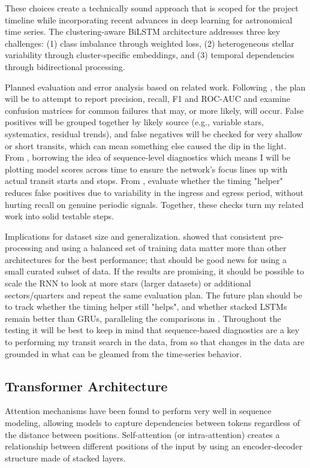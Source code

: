 \documentclass[letterpaper]{article} %
\begin{document}
These choices create a technically sound approach that is scoped for the project timeline while incorporating recent advances in deep learning for astronomical time series. The clustering-aware BiLSTM architecture addresses three key challenges: (1) class imbalance through weighted loss, (2) heterogeneous stellar variability through cluster-specific embeddings, and (3) temporal dependencies through bidirectional processing.

Planned evaluation and error analysis based on related work. Following \cite{Vida2021findingflaresrecurrent}, the plan will be to attempt to report precision, recall, F1 and ROC-AUC and examine confusion matrices for common failures that may, or more likely, will occur. False positives will be grouped together by likely source (e.g., variable stars, systematics, residual trends), and false negatives will be checked for very shallow or short transits, which can mean something else caused the dip in the light. From \cite{kugler2016explorativeapproachkepler}, borrowing the idea of sequence‑level diagnostics which means I will be plotting model scores across time to ensure the network's focus lines up with actual transit starts and stops. From \cite{Du2016markedtemporalpoint}, evaluate whether the timing "helper" reduces false positives due to variability in the ingress and egress period, without hurting recall on genuine periodic signals. Together, these checks turn my related work into solid testable steps.

Implications for dataset size and generalization. \cite{Vida2021findingflaresrecurrent} showed that consistent pre-processing and using a balanced set of training data matter more than other architectures for the best performance; that should be good news for using a small curated subset of data. If the results are promising, it should be possible to scale the RNN to look at more stars (larger datasets) or additional sectors/quarters and repeat the same evaluation plan. The future plan should be to track whether the timing helper still "helps", and whether stacked LSTMs remain better than GRUs, paralleling the comparisons in \cite{Vida2021findingflaresrecurrent}. Throughout the testing it will be best to keep in mind that sequence‑based diagnostics are a key to performing my transit search in the data, from \cite{kugler2016explorativeapproachkepler} so that changes in the data are grounded in what can be gleamed from the time‑series behavior.

\subsection{Transformer Architecture}
Attention mechanisms have been found to perform very well in sequence modeling, allowing models to capture dependencies between tokens regardless of the distance between positions. Self-attention (or intra-attention) creates a relationship between different positions of the input by using an encoder-decoder structure made of stacked layers.
\end{document}
